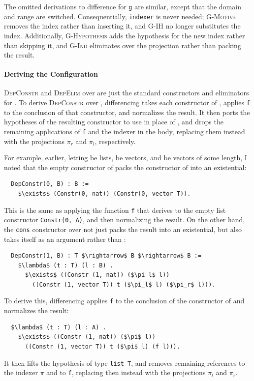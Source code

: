 The omitted derivations to difference for \lstinline{g} are similar,
except that the domain and range are switched. Consequentially, \lstinline{indexer} is never needed;
\textsc{G-Motive} removes the index rather than inserting it, and \textsc{G-IH} no longer substitutes the index.
Additionally, \textsc{G-Hypothesis} adds the hypothesis for the new index
rather than skipping it, and \textsc{G-Ind} eliminates over the projection rather than packing the result. %

\paragraph{Deriving the Configuration}
\textsc{DepConstr} and \textsc{DepElim} over \Aa are just the standard constructors and eliminators for \Aa.
To derive \textsc{DepConstr} over \B, differencing takes each constructor of \Aa,
applies \lstinline{f} to the conclusion of that constructor, and normalizes the result. %
It then ports the hypotheses of the resulting constructor to use \B in place of \Aa, and drops the remaining applications of \lstinline{f}
and the indexer in the body, replacing them instead with the projections $\pi_r$ and $\pi_l$, respectively.

For example, earlier, letting \Aa be lists, \AI be vectors, and \B be vectors of some length,
I noted that the empty constructor of \B packs the constructor of \AI into an existential:

\begin{lstlisting}
  DepConstr(0, B) : B :=
    $\exists$ (Constr(0, nat)) (Constr(0, vector T)).
\end{lstlisting}
This is the same as applying the function \lstinline{f} that \toolnamec derives to the empty list constructor 
\lstinline{Constr(0, A)}, and then normalizing the result.
On the other hand, the \lstinline{cons} constructor over \B not just packs the result into an existential,
but also takes \B itself as an argument rather than \Aa:

\begin{lstlisting}
  DepConstr(1, B) : T $\rightarrow$ B $\rightarrow$ B :=
    $\lambda$ (t : T) (l : B) .
      $\exists$ ((Constr (1, nat)) ($\pi_l$ l))
        ((Constr (1, vector T)) t ($\pi_l$ l) ($\pi_r$ l))).
\end{lstlisting}
To derive this, differencing applies \lstinline{f} to the conclusion of the constructor of \Aa and normalizes the result:

\begin{lstlisting}
  $\lambda$ (t : T) (l : A) .
    $\exists$ ((Constr (1, nat)) ($\pi$ l))
      ((Constr (1, vector T)) t ($\pi$ l) (f l))).
\end{lstlisting}
It then lifts the hypothesis of type \lstinline{list T}, and removes remaining references to the indexer $\pi$ and to \lstinline{f},
replacing then instead with the projections $\pi_l$ and $\pi_r$.

